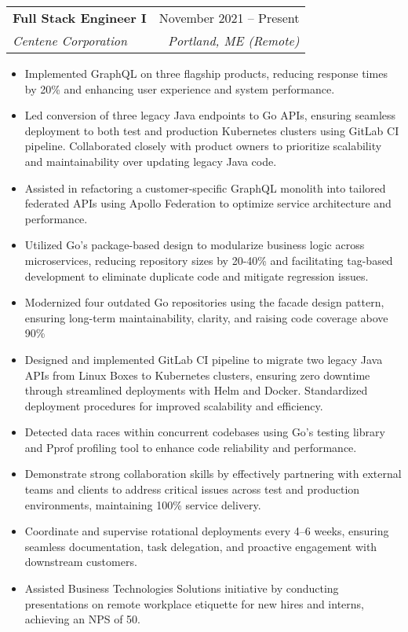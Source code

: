 \documentclass[letterpaper,11pt]{article}
\makeatletter
\newcommand{\resumeItem}[1]{
  \item\small{
    {#1 \vspace{-2pt}}
  }
}
\newcommand{\resumeSubheading}[4]{
  \vspace{-2pt}\item
    \begin{tabular*}{0.97\textwidth}[t]{l@{\extracolsep{\fill}}r}
      \textbf{#1} & #2 \\
      \textit{\small#3} & \textit{\small #4} \\
    \end{tabular*}\vspace{-7pt}
}
\newcommand{\resumeSubSubheading}[2]{
    \item
    \begin{tabular*}{0.97\textwidth}{l@{\extracolsep{\fill}}r}
      \textit{\small#1} & \textit{\small #2} \\
    \end{tabular*}\vspace{-7pt}
}
\newcommand{\resumeSubHeadingListEnd}{\end{itemize}}
\newcommand{\resumeItemListStart}{\begin{itemize}}
\newcommand{\resumeItemListEnd}{\end{itemize}\vspace{-5pt}}
\makeatother
\begin{document}
    \resumeSubheading
      {Full Stack Engineer I}{November 2021 -- Present}
      {Centene Corporation}{Portland, ME (Remote)}
      \resumeItemListStart
        \resumeItem{Implemented GraphQL on three flagship products, reducing response times by 20\% and enhancing user experience and system performance.}
        \resumeItem{Led conversion of three legacy Java endpoints to Go APIs, ensuring seamless deployment to both test and production Kubernetes clusters using GitLab CI pipeline. Collaborated closely with product owners to prioritize scalability and maintainability over updating legacy Java code.}
        \resumeItem{Assisted in refactoring a customer-specific GraphQL monolith into tailored federated APIs using Apollo Federation to optimize service architecture and performance.}
        \resumeItem{Utilized Go’s package-based design to modularize business logic across microservices, reducing repository sizes by 20-40\% and facilitating tag-based development to eliminate duplicate code and mitigate regression issues.}
        \resumeItem{Modernized four outdated Go repositories using the facade design pattern, ensuring long-term maintainability, clarity, and raising code coverage above 90\%}
        \resumeItem{Designed and implemented GitLab CI pipeline to migrate two legacy Java APIs from Linux Boxes to Kubernetes clusters, ensuring zero downtime through streamlined deployments with Helm and Docker. Standardized deployment procedures for improved scalability and efficiency.}
        \resumeItem{Detected data races within concurrent codebases using Go’s testing library and Pprof profiling tool to enhance code reliability and performance.}
        \resumeItem{Demonstrate strong collaboration skills by effectively partnering with external teams and clients to address critical issues across test and production environments, maintaining 100\% service delivery.}
        \resumeItem{Coordinate and supervise rotational deployments every 4–6 weeks, ensuring seamless documentation, task delegation, and proactive engagement with downstream customers.}
        \resumeItem{Assisted Business Technologies Solutions initiative by conducting presentations on remote workplace etiquette for new hires and interns, achieving an NPS of 50.}
      \resumeItemListEnd
      
\end{document}
